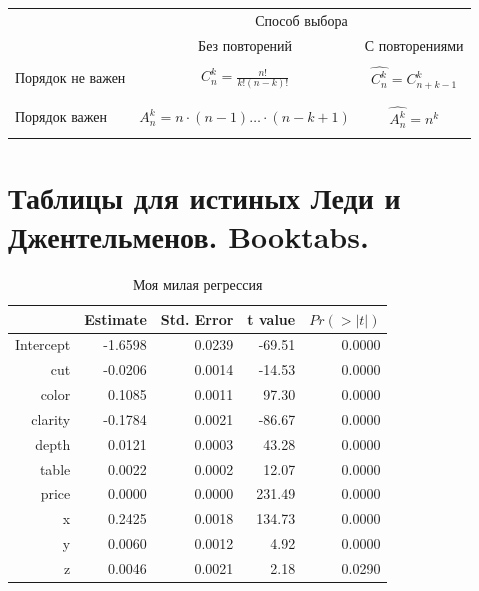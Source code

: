 \documentclass[12pt, a4paper]{article}
\begin{document}
\begin{center}
\begin{tabular}{ |l|c|c| }
\hline
 & \multicolumn{2}{c|}{Способ выбора} \\
\cline{2-3}
 & Без повторений & С повторениями  \\ \hline
\multirow{3}{*}{Порядок не важен}
                & & \\
                & $ C_n^{k} = \frac{n!}{k!(n-k)!} $ & $ \hat{C_n^k} = C_{n+k-1}^k $ \\
                & & \\

\hline
\multirow{3}{*}{Порядок важен}
               & & \\
               & $ A_n^{k} = n \cdot (n-1) \ldots \cdot (n-k+1) $ & $ \hat{A_n^k} = n^k $ \\
               & & \\
\hline
\end{tabular}
\end{center}


\section{Таблицы для истиных Леди и Джентельменов. Booktabs.}

\begin{table}[H]
\centering
\begin{tabular}{@{}rrrrr@{}}
\toprule
& Estimate & Std. Error & t value & $Pr( > | t |)$ \\
\midrule
Intercept & -1.6598 & 0.0239 & -69.51 & 0.0000 \\
cut & -0.0206 & 0.0014 & -14.53 & 0.0000 \\
color & 0.1085 & 0.0011 & 97.30 & 0.0000 \\
clarity & -0.1784 & 0.0021 & -86.67 & 0.0000 \\
depth & 0.0121 & 0.0003 & 43.28 & 0.0000 \\
table & 0.0022 & 0.0002 & 12.07 & 0.0000 \\
price & 0.0000 & 0.0000 & 231.49 & 0.0000 \\
x & 0.2425 & 0.0018 & 134.73 & 0.0000 \\
y & 0.0060 & 0.0012 & 4.92 & 0.0000 \\
z & 0.0046 & 0.0021 & 2.18 & 0.0290 \\
\bottomrule
\end{tabular}
\caption{Моя милая регрессия}
\end{table}
\end{document}
